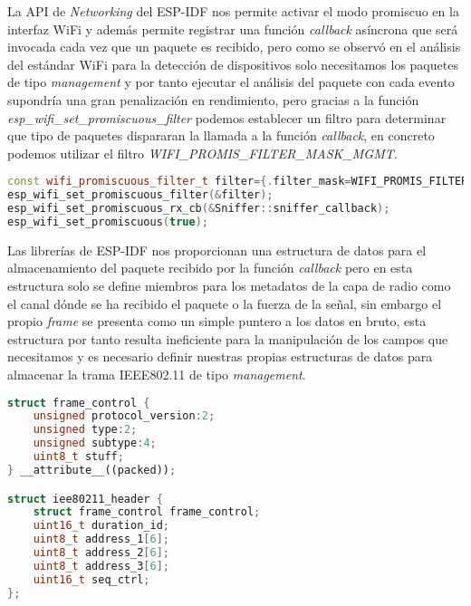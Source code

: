 \documentclass[../proyecto.tex]{subfiles}
\begin{document}
La API de \textit{Networking} del ESP-IDF nos permite activar el modo promiscuo en la interfaz WiFi y además permite registrar una función \textit{callback} asíncrona que será invocada cada vez que un paquete es recibido, pero como se observó en el análisis del estándar WiFi para la detección de dispositivos solo necesitamos los paquetes de tipo \textit{management} y por tanto ejecutar el análisis del paquete con cada evento supondría una gran penalización en rendimiento, pero gracias a la función \textit{esp\_wifi\_set\_promiscuous\_filter} podemos establecer un filtro para determinar que tipo de paquetes dispararan la llamada a la función \textit{callback}, en concreto podemos utilizar el filtro \textit{WIFI\_PROMIS\_FILTER\_MASK\_MGMT}.\\

\begin{minipage}{\linewidth}
\begin{lstlisting}[language=C++, caption=Activación del modo promiscuo con filtrado, captionpos=b, frame=single]
const wifi_promiscuous_filter_t filter={.filter_mask=WIFI_PROMIS_FILTER_MASK_MGMT};
esp_wifi_set_promiscuous_filter(&filter);
esp_wifi_set_promiscuous_rx_cb(&Sniffer::sniffer_callback);
esp_wifi_set_promiscuous(true);
\end{lstlisting}
\end{minipage}

Las librerías de ESP-IDF nos proporcionan una estructura de datos para el almacenamiento del paquete recibido por la función \textit{callback} pero en esta estructura solo se define miembros para los metadatos de la capa de radio como el canal dónde se ha recibido el paquete o la fuerza de la señal, sin embargo el propio \textit{frame} se presenta como un simple puntero a los datos en bruto, esta estructura por tanto resulta ineficiente para la manipulación de los campos que necesitamos y es necesario definir nuestras propias estructuras de datos para almacenar la trama IEEE802.11 de tipo \textit{management}.\\

\begin{minipage}{\linewidth}
\begin{lstlisting}[language=C++, caption=Estructuras de datos para almacenamiento de las cabeceras IEEE802.11 , captionpos=b, frame=single]
struct frame_control {
    unsigned protocol_version:2;
    unsigned type:2;
    unsigned subtype:4;
    uint8_t stuff;
} __attribute__((packed));

struct iee80211_header {
    struct frame_control frame_control;
    uint16_t duration_id;
    uint8_t address_1[6];
    uint8_t address_2[6];
    uint8_t address_3[6];
    uint16_t seq_ctrl;
};
\end{lstlisting}
\end{minipage}
\end{document}
